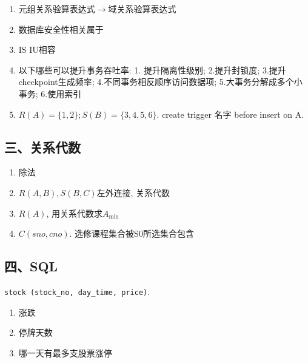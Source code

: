 \begin{enumerate}
    \item 元组关系验算表达式$\to$域关系验算表达式
    \item 数据库安全性相关属于
    \item IS IU相容
    \item 以下哪些可以提升事务吞吐率: 1. 提升隔离性级别; 2.提升封锁度; 3.提升checkpoint生成频率; 4.不同事务相反顺序访问数据项; 5.大事务分解成多个小事务; 6.使用索引
    \item $R(A)=\{1,2\}; S(B)=\{3,4,5,6\}$. create trigger 名字 before insert on A.
\end{enumerate}

\subsection{三、关系代数}

\begin{enumerate}
    \item 除法
    \item $R(A, B), S(B, C)$左外连接, 关系代数
    \item $R(A)$, 用关系代数求$A_{\min}$
    \item $C(sno, cno)$. 选修课程集合被S0所选集合包含
\end{enumerate}

\subsection{四、SQL}

\verb|stock (stock_no, day_time, price)|.
\begin{enumerate}
    \item 涨跌
    \item 停牌天数
    \item 哪一天有最多支股票涨停
\end{enumerate}
